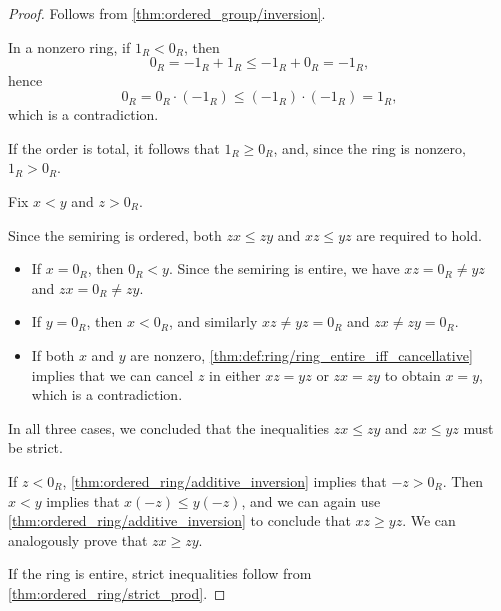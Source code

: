 \begin{proof}
   Follows from \cref{thm:ordered_group/inversion}.

   In a nonzero ring, if \( 1_R < 0_R \), then
  \begin{equation*}
    0_R = -1_R + 1_R \leq -1_R + 0_R = -1_R,
  \end{equation*}
  hence
  \begin{equation*}
    0_R = 0_R \cdot (-1_R) \leq (-1_R) \cdot (-1_R) = 1_R,
  \end{equation*}
  which is a contradiction.

  If the order is total, it follows that \( 1_R \geq 0_R \), and, since the ring is nonzero, \( 1_R > 0_R \).

   Fix \( x < y \) and \( z > 0_R \).

  Since the semiring is ordered, both \( zx \leq zy \) and \( xz \leq yz \) are required to hold.

  \begin{itemize}
    \item If \( x = 0_R \), then \( 0_R < y \). Since the semiring is entire, we have \( xz = 0_R \neq yz \) and \( zx = 0_R \neq zy \).

    \item If \( y = 0_R \), then \( x < 0_R \), and similarly \( xz \neq yz = 0_R \) and \( zx \neq zy = 0_R \).

    \item If both \( x \) and \( y \) are nonzero, \cref{thm:def:ring/ring_entire_iff_cancellative} implies that we can cancel \( z \) in either \( xz = yz \) or \( zx = zy \) to obtain \( x = y \), which is a contradiction.
  \end{itemize}

  In all three cases, we concluded that the inequalities \( zx \leq zy \) and \( zx \leq yz \) must be strict.

   If \( z < 0_R \), \cref{thm:ordered_ring/additive_inversion} implies that \( -z > 0_R \). Then \( x < y \) implies that \( x(-z) \leq y(-z) \), and we can again use \cref{thm:ordered_ring/additive_inversion} to conclude that \( xz \geq yz \). We can analogously prove that \( zx \geq zy \).

  If the ring is entire, strict inequalities follow from \cref{thm:ordered_ring/strict_prod}.


\end{proof}
